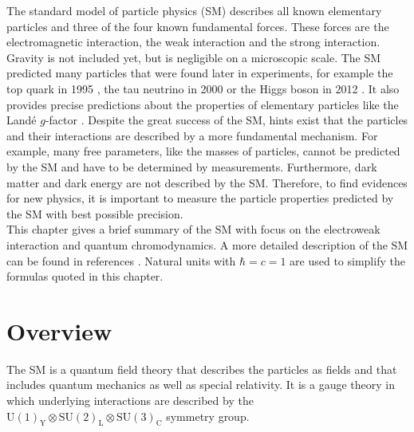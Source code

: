 The standard model of particle physics (SM) describes all known elementary particles and three of the four known fundamental forces. These forces are the electromagnetic interaction, the weak interaction and the strong interaction. Gravity is not included yet, but is negligible on a microscopic scale. The SM predicted many particles that were found later in experiments, for example the top quark in 1995 \cite{tdiscovery}, the tau neutrino in 2000 \cite{tau2000} or the Higgs boson in 2012 \cite{ATLAS_higgs_1207, CMS_higgs_1207}. It also provides precise predictions about the properties of elementary particles like the Landé $g$-factor \cite{Lande}. Despite the great success of the SM, hints exist that the particles and their interactions are described by a more fundamental mechanism. For example, many free parameters, like the masses of particles, cannot be predicted by the SM and have to be determined by measurements. Furthermore, dark matter and dark energy are not described by the SM. Therefore, to find evidences for new physics, it is important to measure the particle properties predicted by the SM with best possible precision. \\

This chapter gives a brief summary of the SM with focus on the electroweak interaction and quantum chromodynamics. A more detailed description of the SM can be found in references \cite{QuarksAndLeptons, Gordon, PhysicsFromSymmetry, Peskin}. Natural units with $\hbar = c = 1$ are used to simplify the formulas quoted in this chapter. 


\section{Overview}

The SM is a quantum field theory that describes the particles as fields and that includes quantum mechanics as well as special relativity. It is a gauge theory in which underlying interactions are described by the $\textrm{U}(1)_\textrm{Y}\otimes \textrm{SU}(2)_\textrm{L}\otimes \textrm{SU}(3)_\textrm{C}$ symmetry group. \\

